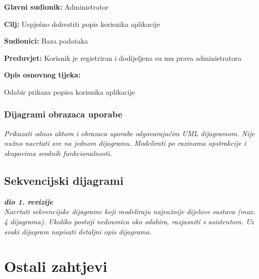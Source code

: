 		
			\noindent {}
			\begin{packed_item}
				
				\item \textbf{Glavni sudionik:} Administrator
				\item  \textbf{Cilj:} Uspješno dohvatiti popis korisnika aplikacije
				\item  \textbf{Sudionici:} Baza podataka
				\item  \textbf{Preduvjet:} Korisnik je registriran i dodijeljena su mu prava administratora
				\item  \textbf{Opis osnovnog tijeka:}
				
				\item[] \begin{packed_enum}
					
					\item Odabir prikaza popisa korisnika aplikacije
					
				\end{packed_enum}
				
			\end{packed_item}
		
				\subsubsection{Dijagrami obrazaca uporabe}
					
					\textit{Prikazati odnos aktora i obrazaca uporabe odgovarajućim UML dijagramom. Nije nužno nacrtati sve na jednom dijagramu. Modelirati po razinama apstrakcije i skupovima srodnih funkcionalnosti.}
				\eject		
				
			\subsection{Sekvencijski dijagrami}
				
				\textbf{\textit{dio 1. revizije}}\\
				
				\textit{Nacrtati sekvencijske dijagrame koji modeliraju najvažnije dijelove sustava (max. 4 dijagrama). Ukoliko postoji nedoumica oko odabira, razjasniti s asistentom. Uz svaki dijagram napisati detaljni opis dijagrama.}
				\eject
	
		\section{Ostali zahtjevi}
		
